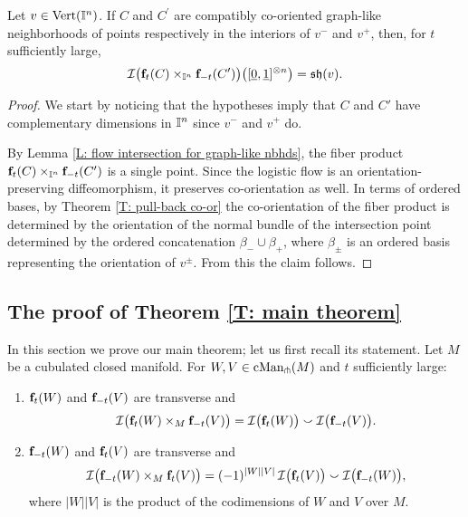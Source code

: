 \begin{lemma} \label{L: sign for graph-like nbhds intersection}
	Let $v \in {\rm Vert}(\mathbb{I}^n)$.
	If $C$ and $C^\prime$ are compatibly co-oriented graph-like neighborhoods of points respectively in the interiors of $v^-$ and $v^+$, then, for $t$ sufficiently large,
	\begin{equation}
	\label{E: sign flow intersection graph-like 1}
	\mathcal{I} \big( \mathbf{f}_t(C) \times_{\mathbb{I}^n} \mathbf{f}_{-t}(C^\prime) \big)
	\big( [\underline{0}, \underline{1}]^{\otimes n} \big) = \mathfrak{sh}(v). \\
	\end{equation}
\end{lemma}

\begin{proof}
	We start by noticing that the hypotheses imply that $C$ and $C'$ have complementary dimensions in $\mathbb{I}^n$ since $v^-$ and $v^+$ do.

	By Lemma \ref{L: flow intersection for graph-like nbhds}, the fiber product $\mathbf{f}_t(C) \times_{\mathbb{I}^n} \mathbf{f}_{-t}(C^\prime)$ is a single point.
	Since the logistic flow is an orientation-preserving diffeomorphism, it preserves co-orientation as well.
	In terms of ordered bases, by Theorem \ref{T: pull-back co-or} the co-orientation of the fiber product is determined by the orientation of the normal bundle of the intersection point determined by the ordered concatenation $\beta_- \cup \beta_+$, where $\beta_\pm$ is an ordered basis representing the orientation of $v^\pm$. From this the claim follows.
\end{proof}

\subsection{The proof of Theorem \ref{T: main theorem}}

In this section we prove our main theorem; let us first recall its statement.
Let $M$ be a cubulated closed manifold.
For $W, V \in \mathrm{cMan}_\pitchfork(M)$ and $t$ sufficiently large:
\begin{enumerate}
\item $\mathbf{f}_t(W)$ and $\mathbf{f}_{-t}(V)$ are transverse and
\begin{equation*}
\mathcal{I} \big( \mathbf{f}_t(W) \times_M \mathbf{f}_{-t}(V) \big) =
\mathcal{I} \big( \mathbf{f}_t(W) \big) \smallsmile \mathcal{I} \big( \mathbf{f}_{-t}(V) \big).
\end{equation*}
\item $\mathbf{f}_{-t}(W)$ and $\mathbf{f}_t(V)$ are transverse and
\begin{equation*}
\mathcal{I} \big( \mathbf{f}_{-t}(W) \times_M \mathbf{f}_t(V) \big) =
(-1)^{|W||V|} \, \mathcal{I} \big( \mathbf{f}_t(V) \big) \smallsmile \mathcal{I} \big( \mathbf{f}_{-t}(W) \big),
\end{equation*}
where $|W||V|$ is the product of the codimensions of $W$ and $V$ over $M$.
\end{enumerate}

